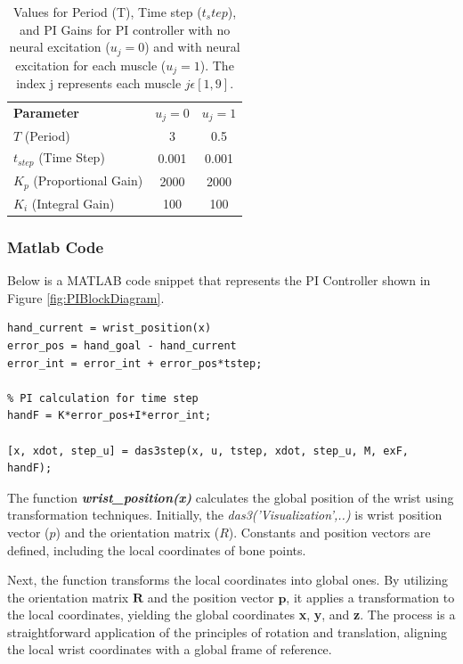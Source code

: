 \begin{table}[h]
    \centering
    \caption{Values for Period (T), Time step ($t_step$), and PI Gains for PI controller with no neural excitation ($u_j=0$) and with neural excitation for each muscle ($u_j = 1$). The index j represents each muscle $j \epsilon[1,9]$.}
    \begin{tabular}{|l|c|c|}
        \hline
        \textbf{Parameter} & \textbf{$u_j=0$} & \textbf{$u_j=1$} \\
        \(T\) (Period) & 3 & 0.5 \\
        \(t_{step}\) (Time Step) & 0.001 & 0.001 \\
        \( K_p \) (Proportional Gain) & 2000 & 2000\\
        \( K_i \) (Integral Gain)     & 100 & 100 \\
        \hline
    \end{tabular}

    \label{tab:PI}
\end{table}

\newpage
\subsubsection{Matlab Code}

Below is a MATLAB code snippet that represents the PI Controller shown in Figure \ref{fig:PIBlockDiagram}. 

\begin{lstlisting}[style=Matlab-editor]
hand_current = wrist_position(x)
error_pos = hand_goal - hand_current
error_int = error_int + error_pos*tstep;

% PI calculation for time step
handF = K*error_pos+I*error_int;

[x, xdot, step_u] = das3step(x, u, tstep, xdot, step_u, M, exF, handF);
\end{lstlisting}

The function \textbf{\textit{wrist\_position(x)}} calculates the global position of the wrist using transformation techniques. Initially, the \textit{das3('Visualization',..)} is wrist position vector ($p$) and the orientation matrix ($R$). Constants and position vectors are defined, including the local coordinates of bone points.

Next, the function transforms the local coordinates into global ones. By utilizing the orientation matrix $\textbf{R}$ and the position vector $\textbf{p}$, it applies a transformation to the local coordinates, yielding the global coordinates \textbf{x}, \textbf{y}, and \textbf{z}. The process is a straightforward application of the principles of rotation and translation, aligning the local wrist coordinates with a global frame of reference.

